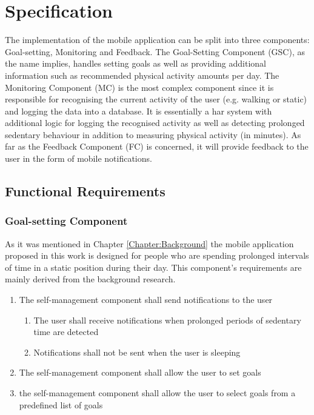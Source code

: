\chapter{Specification}
\label{Chapter:Specification}

The implementation of the mobile application can be split into three components: Goal-setting, Monitoring and Feedback. The Goal-Setting Component (GSC), as the name implies, handles setting goals as well as providing additional information such as recommended physical activity amounts per day. The Monitoring Component (MC) is the most complex component since it is responsible for recognising the current activity of the user (e.g. walking or static) and logging the data into a database. It is essentially a \gls{har} system with additional logic for logging the recognised activity as well as detecting prolonged sedentary behaviour in addition to measuring physical activity (in minutes). As far as the Feedback Component (FC) is concerned, it will provide feedback to the user in the form of mobile notifications. 
\section{Functional Requirements}

    \subsection{Goal-setting Component}
    As it was mentioned in Chapter \ref{Chapter:Background} the mobile application proposed in this work is designed for people who are spending prolonged intervals of time in a static position during their day. This component's requirements are mainly derived from the background research. 
    
    \begin{enumerate}
        \item The self-management component shall send notifications to the user
        \begin{enumerate}
            \item The user shall receive notifications when prolonged periods of sedentary time are detected 
            \item Notifications shall not be sent when the user is sleeping
        \end{enumerate}
        \item The self-management component shall allow the user to set goals
        \item the self-management component shall allow the user to select goals from a predefined list of goals
    \end{enumerate}
    
